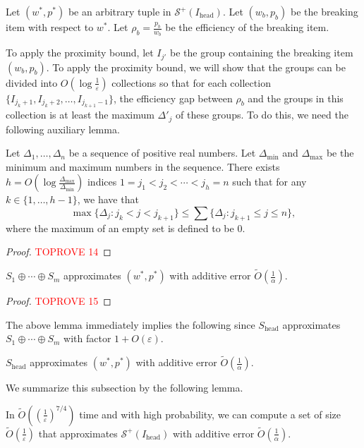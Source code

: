 \documentclass[a4paper,UKenglish,cleveref, autoref, thm-restate, pdfa]{lipics-v2021}
\newcommand{\eps}{\varepsilon}
\renewcommand{\leq}{\leqslant}
\begin{document}
Let $(w^*, p^*)$ be an arbitrary tuple in $\mathcal{S}^+(I_{\mathrm{head}})$. Let $(w_b, p_b)$ be the breaking item with respect to $w^*$. Let $\rho_b = \frac{p_b}{w_b}$ be the efficiency of the breaking item. 

To apply the proximity bound, let $I_{j'}$ be the group containing the breaking item $(w_b, p_b)$. To apply the proximity bound, we will show that the groups can be divided into  $O(\log \frac{1}{\eps})$ collections so that for each collection $\{I_{j_{k} + 1}, I_{j_{k} + 2}, \ldots, I_{j_{k+1}-1} \}$,  the efficiency gap between $\rho_b$ and the groups in this collection is at least the maximum $\Delta'_j$ of these groups. To do this, we need the following auxiliary lemma.

\begin{lemma}\label{lem:cluster}
    Let $\Delta_1, \ldots, \Delta_n$ be a sequence of positive real numbers. Let $\Delta_{\min}$ and $\Delta_{\max}$ be the minimum and maximum numbers in the sequence. There exists $h = O(\log \frac{\Delta_{\max}}{\Delta_{\min}})$ indices $1 = j_1 < j_2 < \cdots < j_h = n$ such that for any $k \in \{1, \ldots, h-1\}$, we have that
    \begin{equation}\label{eq:cluster-original}
            \max\{\Delta_j : j_k < j < j_{k+1}\} \leq \sum\{\Delta_j : j_{k+1} \leq j \leq n\},
    \end{equation}
    where the maximum of an empty set is defined to be $0$.
\end{lemma}
\begin{proof}\textcolor{red}{TOPROVE 14}\end{proof}


\begin{lemma}
    $S_1 \oplus \cdots \oplus S_m$ approximates $(w^*, p^*)$ with additive error $\tilde{O}(\frac{1}{\alpha})$.
\end{lemma}
\begin{proof}\textcolor{red}{TOPROVE 15}\end{proof}

The above lemma immediately implies the following since $S_{\mathrm{head}}$ approximates $ S_1 \oplus \cdots \oplus S_m$ with factor $1 + O(\eps)$.
\begin{corollary}
    $S_{\mathrm{head}}$ approximates $(w^*, p^*)$ with additive error $\tilde{O}(\frac{1}{\alpha})$.
\end{corollary}


We summarize this subsection by the following lemma.
\begin{lemma}\label{lem:approx-head}
    In $\tilde{O}((\frac{1}{\eps})^{7/4})$ time and with high probability, we can compute a set of size $\tilde{O}(\frac{1}{\eps})$ that approximates $\mathcal{S}^+(I_{\mathrm{head}})$ with additive error $\tilde{O}(\frac{1}{\alpha})$.
\end{lemma}
\end{document}

